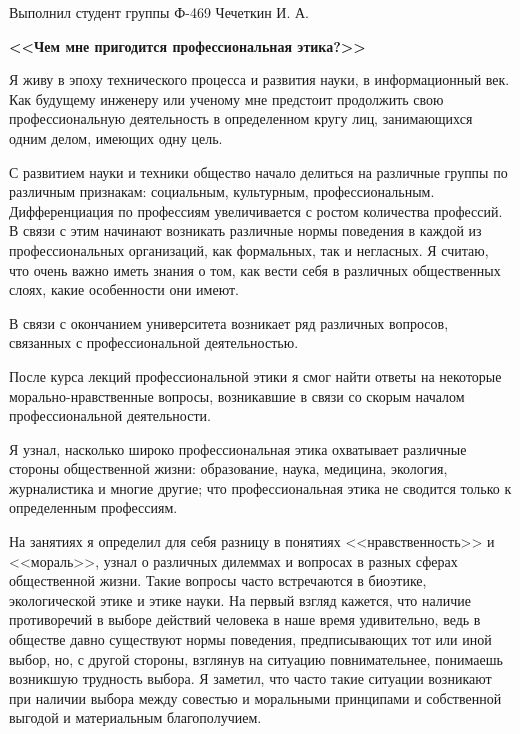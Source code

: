 \documentclass[14pt,pscyr]{hedwork}
\begin{document}
  \onehalfspacing

  \begin{flushright}
    Выполнил студент группы Ф-469 Чечеткин И. А.
  \end{flushright}
  \vspace{-1.5em}
  \begin{center}
    \bfseries <<Чем мне пригодится профессиональная этика?>>
  \end{center}
  
  Я живу в эпоху технического процесса и развития науки, в информационный век.
  Как будущему инженеру или ученому мне предстоит продолжить свою
  профессиональную деятельность в определенном кругу лиц, занимающихся одним
  делом, имеющих одну цель.
  
  С развитием науки и техники общество начало делиться на различные группы по
  различным признакам: социальным, культурным, профессиональным. Дифференциация
  по профессиям увеличивается с ростом количества профессий. В связи с этим
  начинают возникать различные нормы поведения в каждой из профессиональных
  организаций, как формальных, так и негласных. Я считаю, что очень важно иметь
  знания о том, как вести себя в различных общественных слоях, какие
  особенности они имеют.
  
  В связи с окончанием университета возникает ряд различных вопросов, связанных
  с профессиональной деятельностью.
  
  После курса лекций профессиональной этики я смог найти ответы на некоторые
  морально-нравственные вопросы, возникавшие в связи со скорым началом
  профессиональной деятельности.
  
  Я узнал, насколько широко профессиональная этика охватывает различные стороны
  общественной жизни: образование, наука, медицина, экология, журналистика и
  многие другие; что профессиональная этика не сводится только к определенным
  профессиям.
  
  На занятиях я определил для себя разницу в понятиях <<нравственность>> и
  <<мораль>>, узнал о различных дилеммах и вопросах в разных сферах
  общественной жизни. Такие вопросы часто встречаются в биоэтике, экологической
  этике и этике науки. На первый взгляд кажется, что наличие противоречий в
  выборе действий человека в наше время удивительно, ведь в обществе давно
  существуют нормы поведения, предписывающих тот или иной выбор, но, с другой
  стороны, взглянув на ситуацию повнимательнее, понимаешь возникшую трудность
  выбора. Я заметил, что часто такие ситуации возникают при наличии выбора
  между совестью и моральными принципами и собственной выгодой и материальным
  благополучием.
  
\end{document}
